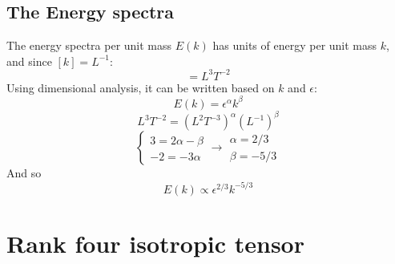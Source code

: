 \documentclass{article}
\begin{document}
\subsection{The Energy spectra}
The energy spectra per unit mass $E(k)$ has units of energy per unit mass $k$, and since $[k] = L^{-1}$:
\begin{equation}
    [E(k)] = L^{3}T^{-2}
\end{equation}
Using dimensional analysis, it can be written based on $k$ and $\epsilon$:
\begin{equation}
    E(k) = \epsilon^\alpha k^\beta
\end{equation}
\begin{equation}
    L^{3}T^{-2} = \left(L^2T^{-3}\right)^\alpha \left(L^{-1}\right)^{\beta}
\end{equation}
\begin{equation}
    \begin{cases}
        3 = 2\alpha - \beta \\ -2 = -3\alpha
    \end{cases}
    \rightarrow
    \begin{matrix}
        \alpha = 2/3 \\ \beta = -5/3
    \end{matrix}
\end{equation}
And so
\begin{equation}
    E(k) \propto \epsilon^{2/3} k^{-5/3}
\end{equation}

\newpage
\section{Rank four isotropic tensor}
\end{document}
